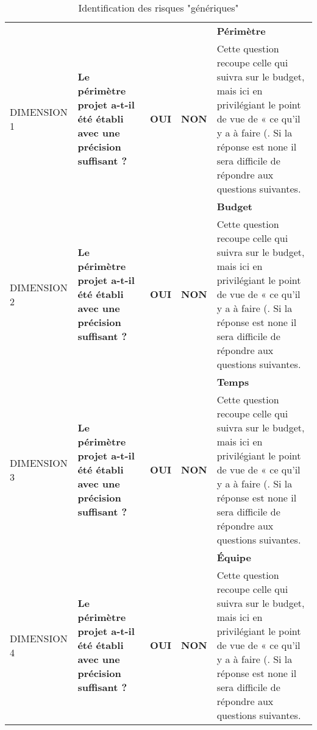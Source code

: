 \documentclass[12pt]{article}
\begin{document}
\begin{landscape}
\begin{table}[H]
\scriptsize
\caption{Identification des risques "génériques"}
\begin{tabular}{p{2.25cm}p{}p{1cm}p{1cm}p{12.25cm}}
\hline  	\cellcolor{violet!50}& \cellcolor{violet!50}& \cellcolor{violet!50}& \cellcolor{violet!50}&\bf Périmètre \cellcolor{violet!50}\\
DIMENSION 1\cellcolor{violet!50} & \bf Le périmètre projet a-t-il été établi avec une précision suffisant ? & \bf OUI \cellcolor{green!50}& \bf NON\cellcolor{red!50} & Cette question recoupe celle qui suivra sur le budget, mais ici en privilégiant le point de vue de « ce qu’il y a à faire (. Si la réponse est none il sera difficile de répondre aux questions suivantes. \\
\hline	\cellcolor{red!90}& \cellcolor{red!90}& \cellcolor{red!90}& \cellcolor{red!90}&\bf Budget \cellcolor{red!90}\\
DIMENSION 2\cellcolor{red!90} & \bf Le périmètre projet a-t-il été établi avec une précision suffisant ? & \bf OUI \cellcolor{green!50}& \bf NON\cellcolor{red!50} & Cette question recoupe celle qui suivra sur le budget, mais ici en privilégiant le point de vue de « ce qu’il y a à faire (. Si la réponse est none il sera difficile de répondre aux questions suivantes. \\
\hline \cellcolor{orange!75}& \cellcolor{orange!75}& \cellcolor{orange!75}& \cellcolor{orange!75}&\bf Temps \cellcolor{orange!75}\\
DIMENSION 3\cellcolor{orange!75} & \bf Le périmètre projet a-t-il été établi avec une précision suffisant ? & \bf OUI \cellcolor{green!50}& \bf NON\cellcolor{red!50} & Cette question recoupe celle qui suivra sur le budget, mais ici en privilégiant le point de vue de « ce qu’il y a à faire (. Si la réponse est none il sera difficile de répondre aux questions suivantes. \\
\hline \cellcolor{yellow!50}& \cellcolor{yellow!50}& \cellcolor{yellow!50}& \cellcolor{yellow!50}&\bf Équipe \cellcolor{yellow!50}\\
DIMENSION 4\cellcolor{yellow!50} & \bf Le périmètre projet a-t-il été établi avec une précision suffisant ? & \bf OUI \cellcolor{green!50}& \bf NON\cellcolor{red!50} & Cette question recoupe celle qui suivra sur le budget, mais ici en privilégiant le point de vue de « ce qu’il y a à faire (. Si la réponse est none il sera difficile de répondre aux questions suivantes. \\

\end{tabular}
\end{table}
\end{landscape}
\end{document}
